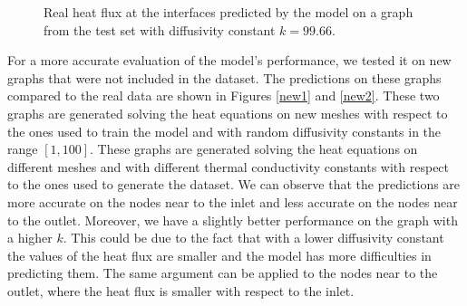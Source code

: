 \documentclass[11pt,a4paper]{article}
\begin{document}
\begin{figure}[H]
    \centering
    \caption{Real heat flux at the interfaces predicted by the model on a graph from the test set with diffusivity constant \(k=99.66\).}
    \label{test}
\end{figure}

For a more accurate evaluation of the model's performance, we tested it on new graphs that were not included in the dataset. 
The predictions on these graphs compared to the real data are shown in Figures \ref{new1} and \ref{new2}. These two graphs are generated solving the heat equations on new meshes with respect to the ones used to train the model and with random diffusivity constants in the range \([1,100]\).
These graphs are generated solving the heat equations on different meshes and with different thermal conductivity constants with respect to the ones used to generate the dataset. 
We can observe that the predictions are more accurate on the nodes near to the inlet and less accurate on the nodes near to the outlet. 
Moreover, we have a slightly better performance on the graph with a higher \(k\). 
This could be due to the fact that with a lower diffusivity constant the values of the heat flux are smaller and the model has more difficulties in predicting them. The same argument can be applied to the nodes near to the outlet, where the heat flux is smaller with respect to the inlet.
\end{document}

